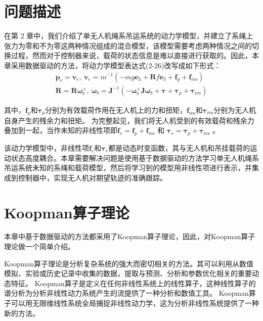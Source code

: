 \documentclass[lang=chs, degree=master, blindreview=false, winfonts=true]{yanputhesis}
\begin{document}
\section{问题描述}
在第 2 章中，我们介绍了单无人机绳系吊运系统的动力学模型，并建立了系绳上张力为零和不为零这两种情况组成的混合模型，该模型需要考虑两种情况之间的切换过程，然而对于控制器来说，载荷的状态信息是难以直接进行获取的。因此，本章采用数据驱动的方法，将动力学模型表达式(2-26)改写成如下形式：
\begin{equation}
	\begin{aligned}
		\dot{\boldsymbol{p}}_e = \boldsymbol{v}_e, \
		\dot{\boldsymbol{v}}_e = m^{-1}\left(-mg\bm{e}_3+\boldsymbol{R}f\bm{e}_3+\bm{f}_p+\bm{f}_{\text{res}}\right) \\
		\dot{\bm{R}} = \bm{R} \bm{\omega}_b^{\times}, \
		\dot{\boldsymbol{\omega}}_b = \boldsymbol{J}^{-1}\left(-\bm{\omega}_b^{\times}\bm{J} \bm{\omega}_b+\boldsymbol{\tau}+ \bm{\tau}_p+ \bm{\tau}_{\text{res}}\right)
	\end{aligned}\label{3-1}
\end{equation}



其中，$\bm{f}_p$和$\bm{\tau}_p$分别为有效载荷作用在无人机上的力和扭矩，$\bm{f}_\text{res}$和$\bm{\tau}_\text{res}$分别为无人机自身产生的残余力和扭矩。
为完整起见，我们将无人机受到的有效载荷和残余力叠加到一起，当作未知的非线性项即$\bm f_e = \bm f_p+ \bm f_{\text{res}}$ 和 $\bm \tau_e = \bm \tau_p+\bm \tau_{\text{res}}$ 。
	
该动力学模型中，非线性项$\bm f_e$和$\bm \tau_e$都是动态时变函数，其与无人机和吊挂载荷的运动状态高度耦合。本章需要解决问题是使用基于数据驱动的方法学习单无人机绳系吊运系统未知的系绳和载荷模型，然后将学习到的模型用非线性项进行表示，并集成到控制器中，实现无人机对期望轨迹的准确跟踪。 



\section{Koopman算子理论}
本章中基于数据驱动的方法都采用了Koopman算子理论，因此，对Koopman算子理论做一个简单介绍。




Koopman算子理论是分析复杂系统的强大而密切相关的方法。其可以利用从数值模拟、实验或历史记录中收集的数据，提取与预测、分析和参数优化相关的重要动态特征。
Koopman算子是定义在任何非线性系统上的线性算子，这种线性算子的谱分析为分析非线性动力系统产生的流提供了一种分析和数值工具。
Koopman算子可以用无限维线性系统全局捕捉非线性动力学，这为分析非线性系统提供了一种新的方法。
	
\end{document}
